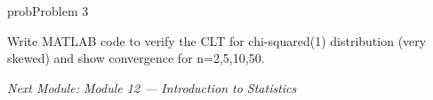 \begin{PSbox}[unbreakable]{prob}{Problem 3}

Write MATLAB code to verify the CLT for chi-squared(1) distribution (very skewed) and show convergence for n=2,5,10,50.

\PSsolution{} 


\begin{Shaded}
\begin{Highlighting}[]
 \OperatorTok{=} \OperatorTok{;}  \OperatorTok{=}\NormalTok{ [}   \NormalTok{]}\OperatorTok{;}
\OperatorTok{;}
  \OperatorTok{=} \OperatorTok{:}
     \OperatorTok{=} \NormalTok{(}\NormalTok{(}\OperatorTok{,} \NormalTok{(}\NormalTok{)}\OperatorTok{,} \NormalTok{)}\OperatorTok{,} \NormalTok{)}\OperatorTok{;}
    \NormalTok{(}\OperatorTok{,}\OperatorTok{,}\NormalTok{)}\OperatorTok{;}
    \NormalTok{(}\OperatorTok{,} \OperatorTok{,} \OperatorTok{,} \NormalTok{)}\OperatorTok{;}  \OperatorTok{;}
     \OperatorTok{=} \NormalTok{(}\OperatorTok{,} \OperatorTok{,} \NormalTok{)}\OperatorTok{;}
    \NormalTok{(}\OperatorTok{,} \NormalTok{(}\OperatorTok{,} \OperatorTok{,} \NormalTok{(}\OperatorTok{/}\NormalTok{(}\NormalTok{)))}\OperatorTok{,} \OperatorTok{,} \OperatorTok{,} \NormalTok{)}\OperatorTok{;}
    \NormalTok{(}\NormalTok{(}\OperatorTok{,} \NormalTok{(}\NormalTok{)))}\OperatorTok{;}
\NormalTok{(}\NormalTok{)}\OperatorTok{;}
\end{Highlighting}
\end{Shaded}

\emph{Next Module: {Module 12 — Introduction to Statistics}}

\end{PSbox}
